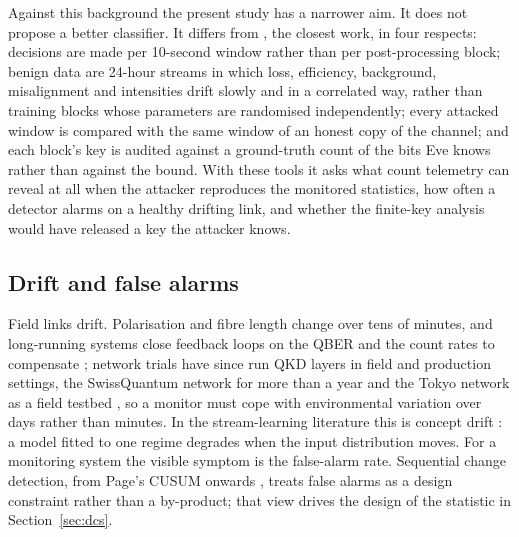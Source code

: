 Against this background the present study has a narrower aim. It does not propose a better classifier. It differs from \cite{mohamed2026}, the closest work, in four respects: decisions are made per 10-second window rather than per post-processing block; benign data are 24-hour streams in which loss, efficiency, background, misalignment and intensities drift slowly and in a correlated way, rather than training blocks whose parameters are randomised independently; every attacked window is compared with the same window of an honest copy of the channel; and each block's key is audited against a ground-truth count of the bits Eve knows rather than against the bound. With these tools it asks what count telemetry can reveal at all when the attacker reproduces the monitored statistics, how often a detector alarms on a healthy drifting link, and whether the finite-key analysis would have released a key the attacker knows.

\subsection{Drift and false alarms}
Field links drift. Polarisation and fibre length change over tens of minutes, and long-running systems close feedback loops on the QBER and the count rates to compensate \cite{dixon2010}; network trials have since run QKD layers in field and production settings, the SwissQuantum network for more than a year \cite{stucki2011} and the Tokyo network as a field testbed \cite{sasaki2011}, so a monitor must cope with environmental variation over days rather than minutes. In the stream-learning literature this is concept drift \cite{gama2014}: a model fitted to one regime degrades when the input distribution moves. For a monitoring system the visible symptom is the false-alarm rate. Sequential change detection, from Page's CUSUM onwards \cite{page1954}, treats false alarms as a design constraint rather than a by-product; that view drives the design of the statistic in Section~\ref{sec:dcs}.
